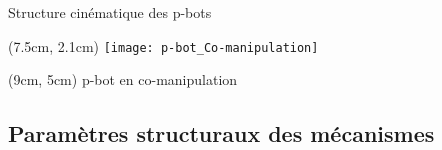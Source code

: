 \documentclass[french]{beamer}
\begin{document}
\begin{frame}{Structure cinématique des p-bots}
\begin{textblock*}{6cm}(7.5cm, 2.1cm)
\centering
\texttt{[image: p-bot\_Co-manipulation]}
\end{textblock*}
\begin{textblock*}{3cm}(9cm, 5cm)
\centering
\tiny{p-bot en co-manipulation}
\end{textblock*}

\end{frame}

\subsection{Paramètres structuraux des mécanismes}
\end{document}
